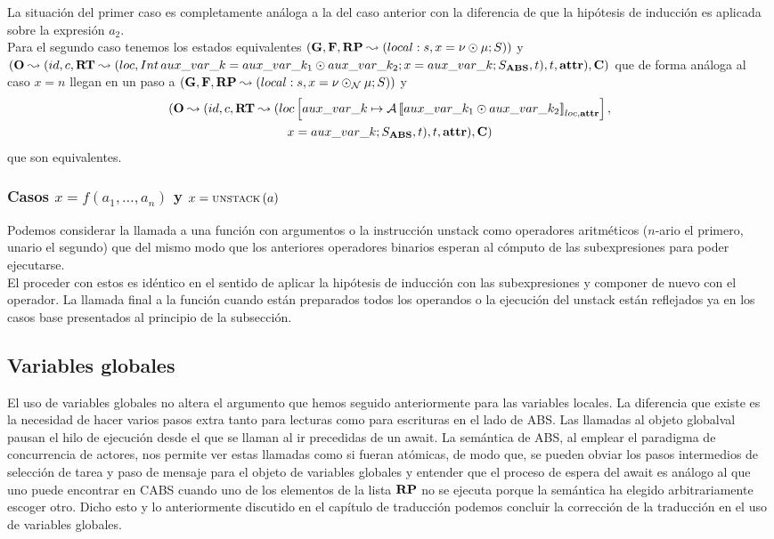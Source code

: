 La situación del primer caso es completamente análoga a la del caso anterior con la diferencia de que la hipótesis de inducción es aplicada sobre la expresión $a_2$.\\

Para el segundo caso tenemos los estados equivalentes $(\mathbf{G}, \mathbf{F}, \textbf{RP} \leadsto (local:s,x = \nu \odot \mu\mbox{;\,}S))$ y $(\mathbf{O} \leadsto (id, c, \textbf{RT} \leadsto (loc, Int\,aux\_var\_k =  aux\_var\_k_1 \odot  aux\_var\_k_2\mbox{;\,} x = aux\_var\_k\mbox{;\,} S_{\textbf{ABS}}, t), t, \textbf{attr}), \mathbf{C})$ que de forma análoga al caso $x = n$ llegan en un paso a $(\mathbf{G}, \mathbf{F}, \textbf{RP} \leadsto (local:s,x = \nu \odot_{\mathcal{N}} \mu\mbox{;\,}S))$ y
\begin{multline*}
  (\mathbf{O} \leadsto (id, c, \textbf{RT} \leadsto (loc \left[ aux\_var\_k\mapsto\mathcal{A} \left\llbracket aux\_var\_k_1 \odot  aux\_var\_k_2 \right\rrbracket_{loc, \textbf{attr}} \right],\\
  x = aux\_var\_k\mbox{;\,}S_{\textbf{ABS}}, t), t, \textbf{attr}), \mathbf{C})
\end{multline*}
que son equivalentes.

\subsubsection{Casos $x = f(a_1, \dots, a_n)$ y $x = \text{\scriptsize{UNSTACK}}\left(a\right)$}
Podemos considerar la llamada a una función con argumentos o la instrucción unstack como operadores aritméticos ($n$-ario el primero, unario el segundo) que del mismo modo que los anteriores operadores binarios esperan al cómputo de las subexpresiones para poder ejecutarse.\\

El proceder con estos es idéntico en el sentido de aplicar la hipótesis de inducción con las subexpresiones y componer de nuevo con el operador. La llamada final a la función cuando están preparados todos los operandos o la ejecución del unstack están reflejados ya en los casos base presentados al principio de la subsección.

\subsection{Variables globales}

El uso de variables globales no altera el argumento que hemos seguido anteriormente para las variables locales. La diferencia que existe es la necesidad de hacer varios pasos extra tanto para lecturas como para escrituras en el lado de ABS. Las llamadas al objeto globalval pausan el hilo de ejecución desde el que se llaman al ir precedidas de un await. La semántica de ABS, al emplear el paradigma de concurrencia de actores, nos permite ver estas llamadas como si fueran atómicas, de modo que, se pueden obviar los pasos intermedios de selección de tarea y paso de mensaje para el objeto de variables globales y entender que el proceso de espera del await es análogo al que uno puede encontrar en CABS cuando uno de los elementos de la lista $\textbf{RP}$ no se ejecuta porque la semántica ha elegido arbitrariamente escoger otro. Dicho esto y lo anteriormente discutido en el capítulo de traducción podemos concluir la corrección de la traducción en el uso de variables globales.

